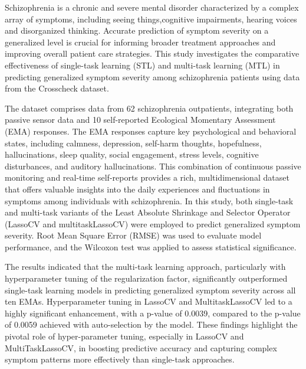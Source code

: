 Schizophrenia is a chronic and severe mental disorder characterized by a complex array of symptoms, including seeing things,cognitive impairments, hearing voices and disorganized thinking. Accurate prediction of symptom severity on a generalized level is crucial for informing broader treatment approaches and improving overall patient care strategies. This study investigates the comparative effectiveness of single-task learning (STL) and multi-task learning (MTL) in predicting generalized symptom severity among schizophrenia patients using data from the Crosscheck dataset.

The dataset comprises data from 62 schizophrenia outpatients, integrating both passive sensor data and 10 self-reported Ecological Momentary Assessment (EMA) responses. The EMA responses capture key psychological and behavioral states, including calmness, depression, self-harm thoughts, hopefulness, hallucinations, sleep quality, social engagement, stress levels, cognitive disturbances, and auditory hallucinations. This combination of continuous passive monitoring and real-time self-reports provides a rich, multidimensional dataset that offers valuable insights into the daily experiences and fluctuations in symptoms among individuals with schizophrenia. In this study, both single-task and multi-task variants of the Least Absolute Shrinkage and Selector Operator (LassoCV and multitaskLassoCV) were employed to predict generalized symptom severity. Root Mean Square Error (RMSE) was used to evaluate model performance, and the Wilcoxon test was applied to assess statistical significance.


The results indicated that the multi-task learning approach, particularly with hyperparameter tuning of the regularization factor, significantly outperformed single-task learning models in predicting generalized symptom severity across all ten EMAs. Hyperparameter tuning in LassoCV and MultitaskLassoCV led to a highly significant enhancement, with a p-value of 0.0039, compared to the p-value of 0.0059 achieved with auto-selection by the model. These findings highlight the pivotal role of hyper-parameter tuning, especially in LassoCV and MultiTaskLassoCV, in boosting predictive accuracy and capturing complex symptom patterns more effectively than single-task approaches.




